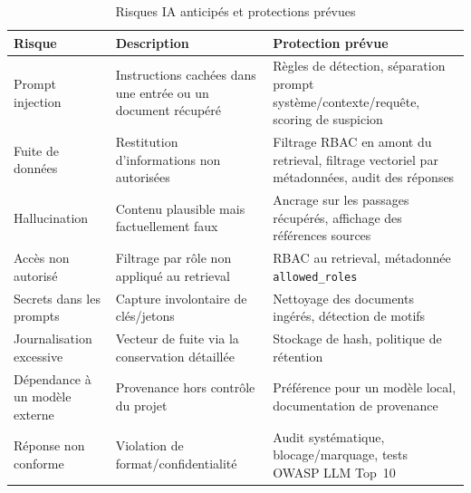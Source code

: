 \begin{table}[htbp]
\centering
\scriptsize
\begin{tabular}{@{}p{2.6cm}p{4.2cm}p{5.4cm}@{}}
\toprule
\textbf{Risque} & \textbf{Description} & \textbf{Protection prévue} \\
\midrule
Prompt injection & Instructions cachées dans une entrée ou un document récupéré & Règles de détection, séparation prompt système/contexte/requête, scoring de suspicion \\
Fuite de données & Restitution d'informations non autorisées & Filtrage RBAC en amont du retrieval, filtrage vectoriel par métadonnées, audit des réponses \\
Hallucination & Contenu plausible mais factuellement faux & Ancrage sur les passages récupérés, affichage des références sources \\
Accès non autorisé & Filtrage par rôle non appliqué au retrieval & RBAC au retrieval, métadonnée \texttt{allowed\_roles} \\
Secrets dans les prompts & Capture involontaire de clés/jetons & Nettoyage des documents ingérés, détection de motifs \\
Journalisation excessive & Vecteur de fuite via la conservation détaillée & Stockage de hash, politique de rétention \\
Dépendance à un modèle externe & Provenance hors contrôle du projet & Préférence pour un modèle local, documentation de provenance \\
Réponse non conforme & Violation de format/confidentialité & Audit systématique, blocage/marquage, tests OWASP LLM Top~10 \\
\bottomrule
\end{tabular}
\caption{Risques IA anticipés et protections prévues}
\label{tab:risques_ia_devsecops}
\end{table}

